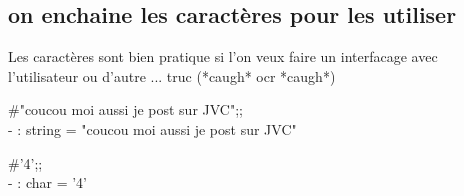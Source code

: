   \subsection{on enchaine les caractères pour les utiliser}
  \begin{frame}
    Les caractères sont bien pratique si l'on veux faire un interfacage avec l'utilisateur ou d'autre ... truc (*caugh* ocr *caugh*)
    \vspace{0.5cm}
    \begin{minipage}[t]{10cm}
      \#"coucou moi aussi je post sur JVC";;\\
      - : string = "coucou moi aussi je post sur JVC"
    \end{minipage}
    \begin{minipage}[t]{5cm}
      \#'4';;\\
      - : char = '4'
    \end{minipage}
     
  \end{frame}
